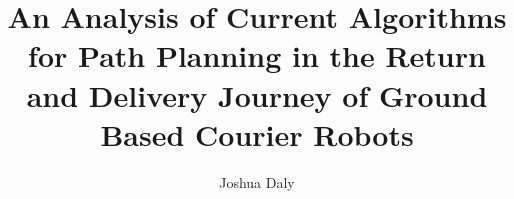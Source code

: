\documentclass[12pt]{report}
\newlength{\defbaselineskip}
\newcommand{\setlinespacing}[1]%
           {\setlength{\baselineskip}{#1 \defbaselineskip}}
\begin{document}
\setlinespacing{1.5}

\title{An Analysis of Current Algorithms for Path Planning in the Return and Delivery Journey of Ground Based Courier Robots}

\author{Joshua Daly}



\address{Dublin, Ireland}


\submitdate{\today}



\beforepreface

{ 
}

%

\afterpreface

\pagestyle{fancy}
\setcounter{page}{1}





%
%
%



%
\end{document}

